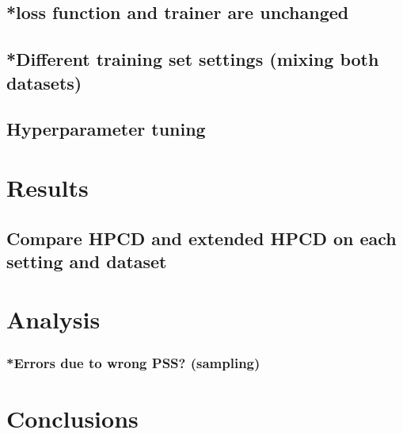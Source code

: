 \subsection{*loss function and trainer are unchanged}
\subsection{*Different training set settings (mixing both datasets)}
\subsection{Hyperparameter tuning}

\section{Results}
\subsection{Compare HPCD and extended HPCD on each setting and dataset}

\section{Analysis}
\subsubsection{*Errors due to wrong PSS? (sampling)}

\section{Conclusions}
